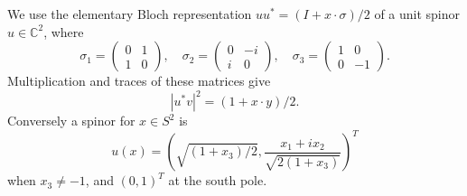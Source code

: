 We use the elementary Bloch representation
$uu^*=(I+x\cdot\sigma)/2$ of a unit spinor $u\in\mathbb C^2$, where
\[
 \sigma_1=\begin{pmatrix}0&1\\1&0\end{pmatrix},\quad
 \sigma_2=\begin{pmatrix}0&-i\\i&0\end{pmatrix},\quad
 \sigma_3=\begin{pmatrix}1&0\\0&-1\end{pmatrix}.
\]
Multiplication and traces of these matrices give
\begin{equation}\label{alg:bloch-identity}
 |u^*v|^2=(1+x\cdot y)/2.
\end{equation}
Conversely a spinor for $x\in S^2$ is
\[
 u(x)=\left(\sqrt{(1+x_3)/2},
       \frac{x_1+i x_2}{\sqrt{2(1+x_3)}}\right)^T
\]
when $x_3\ne-1$, and $(0,1)^T$ at the south pole.

